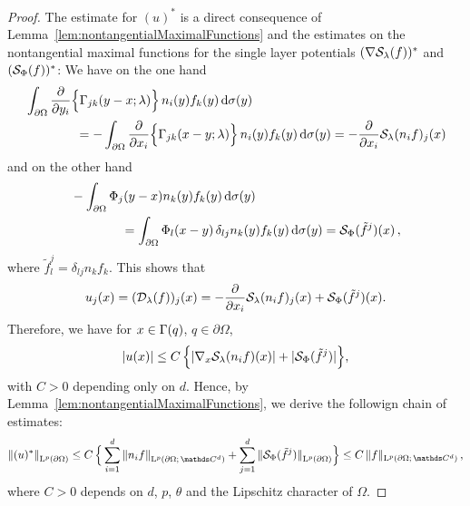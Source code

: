 \begin{proof}
  The estimate for $(u)^*$ is a direct consequence of Lemma~\ref{lem:nontangentialMaximalFunctions} and the estimates on the nontangential maximal functions for the single layer potentials $(\nabla \mathcal{S}_\lambda(f))^*$ and $(\mathcal{S}_\Phi(f))^*$:
  We have on the one hand
  \begin{align}
    \label{eq:rep1}
    \begin{alignedat}{1}
    &\int_{\partial\Omega} \frac{\partial}{\partial y_i} \Big\{ \Gamma_{jk}(y - x; \lambda) \Big\} \, n_i(y) f_k(y) \, {\operatorname{d}\!{\sigma}}(y) \\
    &\qquad\qquad= -\int_{\partial\Omega} \frac{\partial}{\partial x_i} \Big\{ \Gamma_{jk}(x - y; \lambda) \Big\}\, n_i(y) f_k(y) \, {\operatorname{d}\!{\sigma}}(y)
    = -\frac{\partial}{\partial x_i} \mathcal{S}_\lambda(n_i f)_j(x)
    \end{alignedat}
  \end{align}
  and on the other hand
  \begin{align}
    \label{eq:rep2}
    \begin{alignedat}{1}
    &-\int_{\partial\Omega} \Phi_j(y - x) n_k(y) f_k(y) \, {\operatorname{d}\!{\sigma}}(y) \\
    &\qquad\qquad= \int_{\partial\Omega} \Phi_l(x - y)\, \delta_{lj} n_k(y) f_k(y) \, {\operatorname{d}\!{\sigma}}(y)
    = \mathcal{S}_\Phi(\tilde f^j)(x)\,, 
    \end{alignedat}
  \end{align}
  where $\tilde f^j_l = \delta_{lj} n_k f_k$.
  This shows that
  \begin{align*}
    u_j(x) = (\mathcal{D}_\lambda(f))_j(x) = -\frac{\partial}{\partial x_i} \mathcal{S}_\lambda(n_i f)_j(x) + \mathcal{S}_\Phi(\tilde f^j)(x).
  \end{align*}
  Therefore, we have for $x \in \Gamma(q)$, $q \in \partial\Omega$,
  \begin{align*}
    |u(x)| \leq C\, \Big\{ |\nabla_x \mathcal{S}_\lambda(n_i f)(x)| + |\mathcal{S}_\Phi(\tilde f^j) | \Big\}, 
  \end{align*}
  with $C > 0$ depending only on $d$.
  Hence, by Lemma~\ref{lem:nontangentialMaximalFunctions}, we derive the followign chain of estimates:
  \begin{align*}
    \| (u)^* \|^{}_{\Ell^p(\partial\Omega)} 
    \leq C\, \Big\{ \sum_{i = 1}^d \| n_i f \|^{}_{\Ell^p(\partial\Omega; \,\C^d)} + \sum_{j = 1}^d \| \slp_\Phi(\tilde f^j) \|^{}_{\Ell^p(\partial\Omega)}\Big\} 
    \leq C\, \|f\|_{\Ell^p(\partial\Omega;\, \C^d)}\,,
  \end{align*}
  where $C > 0$ depends on $d$, $p$, $\theta$ and the Lipschitz character of $\Omega$.


\end{proof}
